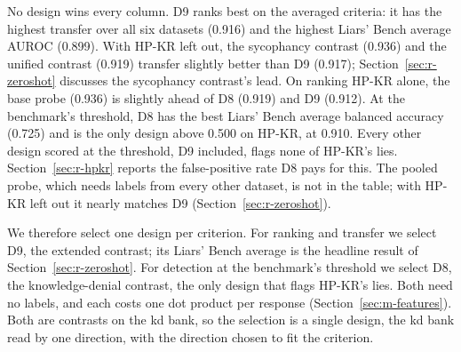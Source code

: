 No design wins every column. %
D9 ranks best on the averaged criteria: it has the highest transfer over all six datasets (0.916) and the highest Liars' Bench average AUROC (0.899). %
With HP-KR left out, the sycophancy contrast (0.936) and the unified contrast (0.919) transfer slightly better than D9 (0.917); Section~\ref{sec:r-zeroshot} discusses the sycophancy contrast's lead. %
On ranking HP-KR alone, the base probe (0.936) is slightly ahead of D8 (0.919) and D9 (0.912). %
At the benchmark's threshold, D8 has the best Liars' Bench average balanced accuracy (0.725) and is the only design above 0.500 on HP-KR, at 0.910. %
Every other design scored at the threshold, D9 included, flags none of HP-KR's lies. %
Section~\ref{sec:r-hpkr} reports the false-positive rate D8 pays for this. %
The pooled probe, which needs labels from every other dataset, is not in the table; with HP-KR left out it nearly matches D9 (Section~\ref{sec:r-zeroshot}). %

We therefore select one design per criterion. %
For ranking and transfer we select D9, the extended contrast; its Liars' Bench average is the headline result of Section~\ref{sec:r-zeroshot}. %
For detection at the benchmark's threshold we select D8, the knowledge-denial contrast, the only design that flags HP-KR's lies. %
Both need no labels, and each costs one dot product per response (Section~\ref{sec:m-features}). %
Both are contrasts on the kd bank, so the selection is a single design, the kd bank read by one direction, with the direction chosen to fit the criterion. %

